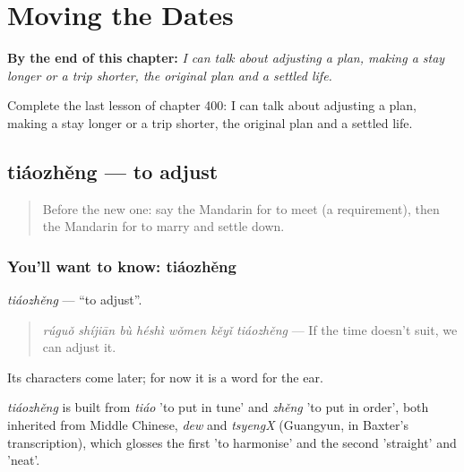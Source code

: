 
\chapter{Moving the Dates}
\label{ch:zh-moving-the-dates}

\begin{chapteropening}
\textbf{By the end of this chapter:} \emph{I can talk about adjusting a plan, making a stay longer or a trip shorter, the original plan and a settled life.}

Complete the last lesson of chapter 400: I can talk about adjusting a plan, making a stay longer or a trip shorter, the original plan and a settled life.
\end{chapteropening}

\section[tiáozhěng]{tiáozhěng — to adjust}

\label{lesson:ZH-C400-tiaozheng}



\begin{quote}
Before the new one: say the Mandarin for to meet (a requirement), then the Mandarin for to marry and settle down.
\end{quote}

\subsection*{You'll want to know: tiáozhěng}
\emph{tiáozhěng} — \textquotedblleft{}to adjust\textquotedblright{}.

\begin{quote}
\emph{rúguǒ shíjiān bù héshì wǒmen kěyǐ tiáozhěng} — If the time doesn't suit, we can adjust it.
\end{quote}

Its characters come later; for now it is a word for the ear.

\begin{cousinweb}
\emph{tiáozhěng} is built from \emph{tiáo} 'to put in tune' and \emph{zhěng} 'to put in order', both inherited from Middle Chinese, \emph{dew} and \emph{tsyengX} (Guangyun, in Baxter's transcription), which glosses the first 'to harmonise' and the second 'straight' and 'neat'.
\end{cousinweb}

